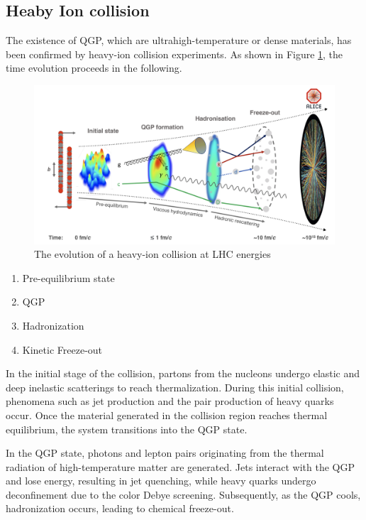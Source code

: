     \subsection{Heaby Ion collision}
        The existence of QGP, which are ultrahigh-temperature or dense materials, has been confirmed by heavy-ion collision experiments. As shown in Figure  \ref{Intro:HIC:space_time_evaluation_of_HIC}, the time evolution proceeds in the following. 
        
        \begin{figure}[hbtp]
            \centering
            \includegraphics[keepaspectratio, scale=0.4]{fig/1_5_QGP_Evol.png}
            \caption{The evolution of a heavy-ion collision at LHC energies\cite{QGP_evo}}
            \label{Intro:HIC:space_time_evaluation_of_HIC}
        \end{figure}
        
        \begin{enumerate}
            \item Pre-equilibrium state
            \item QGP
            \item Hadronization
            \item Kinetic Freeze-out
        \end{enumerate}
        
        In the initial stage of the collision, partons from the nucleons undergo elastic and deep inelastic scatterings to reach thermalization. During this initial collision, phenomena such as jet production and the pair production of heavy quarks occur. Once the material generated in the collision region reaches thermal equilibrium, the system transitions into the QGP state.  
        
        In the QGP state, photons and lepton pairs originating from the thermal radiation of high-temperature matter are generated. Jets interact with the QGP and lose energy, resulting in jet quenching, while heavy quarks undergo deconfinement due to the color Debye screening. Subsequently, as the QGP cools, hadronization occurs, leading to chemical freeze-out.  
        
